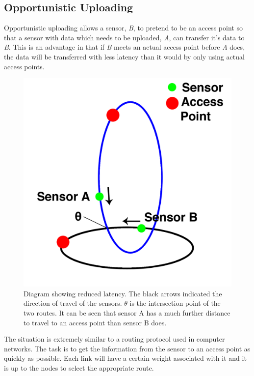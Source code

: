 \subsection{Opportunistic Uploading}\label{opportunisticuploading}

Opportunistic uploading allows a sensor, \emph{B}, to pretend to be an access point so that a sensor with data which needs to be uploaded, \emph{A}, can transfer it's data to \emph{B}. This is an advantage in that if \emph{B} meets an actual access point before \emph{A} does, the data will be transferred with less latency than it would by only using actual access points. 

\begin{figure}[H]
    \begin{center}
        \includegraphics[scale=0.2]{./images/mpp1/Intersection.png}
        \caption{Diagram showing reduced latency. The black arrows indicated the direction of travel of the sensors. $\theta$ is the intersection point of the two routes. It can be seen that sensor A has a much further distance to travel to an access point than sensor B does.}
        \label{fig:opportunisticdiagram}
    \end{center}
\end{figure}

The situation is extremely similar to a routing protocol used in computer networks. The task is to get the information from the sensor to an access point as quickly as possible. Each link will have a certain weight associated with it and it is up to the nodes to select the appropriate route. 

